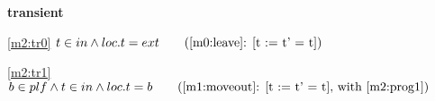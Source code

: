 \textbf{transient}
\begin{block}
\item[ \eqref{m2:tr0} ]$t \in in \land loc.t = ext  \qquad \text{(\ref{m0:leave}: [t := t' = t])}$ %
\item[ \eqref{m2:tr1} ]$b \in plf \land t \in in \land loc.t = b  \qquad \text{(\ref{m1:moveout}: [t := t' = t], with \eqref{m2:prog1})}$ %
\end{block}
